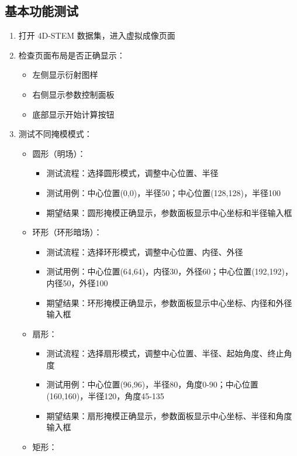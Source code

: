 \documentclass[a4paper,12pt]{report}	%
\begin{document}
\subsection{基本功能测试}
\begin{enumerate}
    \item 打开 4D-STEM 数据集，进入虚拟成像页面
    \item 检查页面布局是否正确显示：
    \begin{itemize}
        \item 左侧显示衍射图样
        \item 右侧显示参数控制面板
        \item 底部显示开始计算按钮
    \end{itemize}
    \item 测试不同掩模模式：
    \begin{itemize}
        \item 圆形（明场）：
        \begin{itemize}
            \item 测试流程：选择圆形模式，调整中心位置、半径
            \item 测试用例：中心位置(0,0)，半径50；中心位置(128,128)，半径100
            \item 期望结果：圆形掩模正确显示，参数面板显示中心坐标和半径输入框
        \end{itemize}
        \item 环形（环形暗场）：
        \begin{itemize}
            \item 测试流程：选择环形模式，调整中心位置、内径、外径
            \item 测试用例：中心位置(64,64)，内径30，外径60；中心位置(192,192)，内径50，外径100
            \item 期望结果：环形掩模正确显示，参数面板显示中心坐标、内径和外径输入框
        \end{itemize}
        \item 扇形：
        \begin{itemize}
            \item 测试流程：选择扇形模式，调整中心位置、半径、起始角度、终止角度
            \item 测试用例：中心位置(96,96)，半径80，角度0-90；中心位置(160,160)，半径120，角度45-135
            \item 期望结果：扇形掩模正确显示，参数面板显示中心坐标、半径和角度输入框
        \end{itemize}
        \item 矩形：

\end{itemize}
\end{enumerate}
\end{document}
